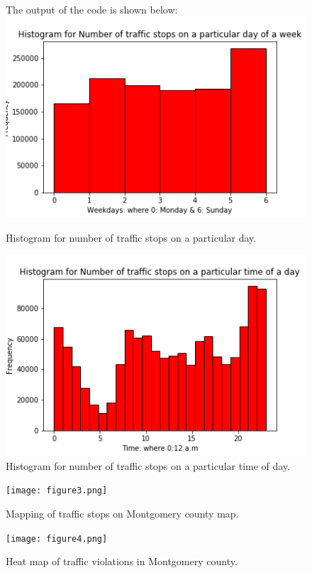 \documentclass[11pt,oneside]{article}
\begin{document}
\begin{figure}[htp]
The output of the code is shown below:
	\centering
	\includegraphics[width=.8\textwidth,  scale = 0.3]{figure1.png}
 	\caption{{\color{black}Histogram for number of traffic stops on a particular day.}}
  	\label{fig:sample}

	\vspace{1cm}
	\includegraphics[width=.8\textwidth, scale = 0.3]{figure2.png}
 	\caption{{\color{black}Histogram for number of traffic stops on a particular time of day.}}
  	\label{fig:sample}
\end{figure}

\begin{figure}[htp]
	\centering
	\texttt{[image: figure3.png]}
 	\caption{{\color{black}Mapping of traffic stops on Montgomery county map.}}
  	\label{fig:sample}

	\vspace{2cm}
	\texttt{[image: figure4.png]}
 	\caption{{\color{black}Heat map of traffic violations in Montgomery county.}}
  	\label{fig:sample}
\end{figure}


\clearpage
\end{document}
